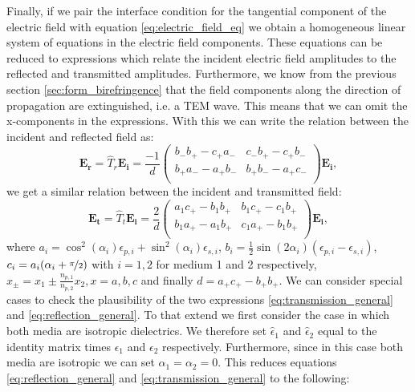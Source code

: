 Finally, if we pair the interface condition for the tangential component of the electric field with equation \ref{eq:electric_field_eq} we obtain a homogeneous linear system of equations in the electric field components. These equations can be reduced to expressions which relate the incident electric field amplitudes to the reflected and transmitted amplitudes. Furthermore, we know from the previous section \ref{sec:form_birefringence} that the field components along the direction of propagation are extinguished, i.e. a TEM wave. This means that we can omit the x-components in the expressions. With this we can write the relation between the incident and reflected field as:
\begin{equation}
    \label{eq:reflection_general}
    \bm{E_r} = \hat{T}_r \bm{E_i} =
    \frac{-1}{d}
    \begin{pmatrix}
        b_-b_+ - c_+a_- & c_-b_+ - c_+b_- \\
        b_+a_- - a_+b_- & b_+b_- - a_+c_- \\
    \end{pmatrix}
    \bm{E_i},
\end{equation}
we get a similar relation between the incident and transmitted field:
\begin{equation}
    \label{eq:transmission_general}
    \bm{E_t} = \hat{T}_t \bm{E_i} =
    \frac{2}{d}
    \begin{pmatrix}
        a_1c_+ - b_1b_+ & b_1c_+ - c_1b_+ \\
        b_1a_+ - a_1b_+ & c_1a_+ - b_1b_+ \\
    \end{pmatrix}
    \bm{E_i},
\end{equation}
where $a_i=\cos^2(\alpha_i)\epsilon_{p,i}+\sin^2(\alpha_i)\epsilon_{s,i}$, $b_i=\frac{1}{2}\sin(2\alpha_i)(\epsilon_{p,i}-\epsilon_{s,i})$, $c_i = a_i(\alpha_i + \nicefrac{\pi}{2})$ with $i=1,2$ for medium 1 and 2 respectively, $x_{\pm}=x_1\pm \frac{n_{p,1}}{n_{p,2}} x_2, x=a,b,c$ and finally $d=a_+c_+-b_+b_+$. We can consider special cases to check the plausibility of the two expressions \ref{eq:transmission_general} and \ref{eq:reflection_general}. To that extend we first consider the case in which both media are isotropic dielectrics. We therefore set $\hat{\epsilon}_1$ and $\hat{\epsilon}_2$ equal to the identity matrix times $\epsilon_1$ and $\epsilon_2$ respectively. Furthermore, since in this case both media are isotropic we can set $\alpha_1 = \alpha_2 = 0$. This reduces equations \ref{eq:reflection_general} and \ref{eq:transmission_general} to the following:
